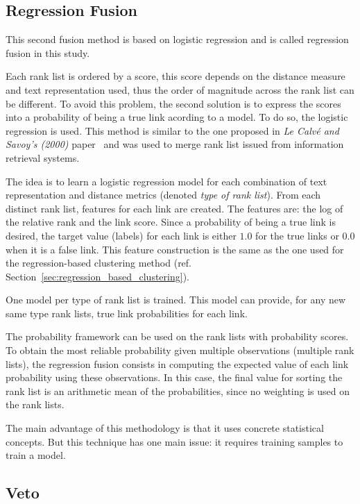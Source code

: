 \subsection{Regression Fusion \label{sec:regression_fusion}}

This second fusion method is based on logistic regression and is called regression fusion in this study.

Each rank list is ordered by a score, this score depends on the distance measure and text representation used, thus the order of magnitude across the rank list can be different.
To avoid this problem, the second solution is to express the scores into a probability of being a true link acording to a model.
To do so, the logistic regression is used.
This method is similar to the one proposed in \textit{Le Calvé and Savoy's (2000)} paper~\cite{le_calve_database_merging} and was used to merge rank list issued from information retrieval systems.

The idea is to learn a logistic regression model for each combination of text representation and distance metrics (denoted \textit{type of rank list}).
From each distinct rank list, features for each link are created.
The features are: the log of the relative rank and the link score.
Since a probability of being a true link is desired, the target value (labels) for each link is either $1.0$ for the true links or $0.0$ when it is a false link.
This feature construction is the same as the one used for the regression-based clustering method (ref. Section~\ref{sec:regression_based_clustering}).

One model per type of rank list is trained.
This model can provide, for any new same type rank lists, true link probabilities for each link.

The probability framework can be used on the rank lists with probability scores.
To obtain the most reliable probability given multiple observations (multiple rank lists), the regression fusion consists in computing the expected value of each link probability using these observations.
In this case, the final value for sorting the rank list is an arithmetic mean of the probabilities, since no weighting is used on the rank lists.

The main advantage of this methodology is that it uses concrete statistical concepts.
But this technique has one main issue: it requires training samples to train a model.

\subsection{Veto}

